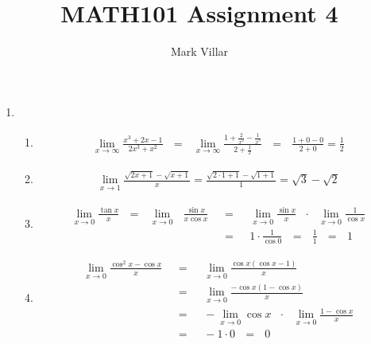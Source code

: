 \documentclass[12pt]{amsart}
\title{MATH101 Assignment 4}
\author{Mark Villar}
\begin{document}
 

\maketitle 

\begin{enumerate}
	
	\item 
	
		\begin{enumerate}
		
			\item 
				\begin{eqnarray}
				\lim_{x \rightarrow \infty} \frac{x^3+2x-1}{2x^3+x^2} \text{ }=\text{ }\lim_{x \rightarrow \infty}
				\frac{1+\frac{2}{x^2}-\frac{1}{x^3}}{2+\frac{1}{x}}\text{ }=\text{ }\frac{1+0-0}{2+0}=\frac{1}{2}
				\nonumber
				\end{eqnarray}
			
			\item  
				\begin{eqnarray}
				\lim_{x \rightarrow 1} \frac{\sqrt{2x+1}-\sqrt{x+1}}{x}=\frac{\sqrt{2\cdot1+1}-\sqrt{1+1}}{1}
				=\sqrt{3}-\sqrt{2} \nonumber
				\end{eqnarray}
			
			\item 
				\begin{eqnarray}
				\lim_{x \rightarrow 0} \frac{\tan{x}}{x}\text{ } = \text{ } \lim_{x \rightarrow 0} 
				\text{ }\frac{\sin{x}}{x\cos{x}}\text{ } & = & \text{ }\lim_{x \rightarrow 0} \frac{\sin{x}}{x}
				\text{ } \cdot \text{ } \lim_{x \rightarrow 0} \frac{1}{\cos{x}} \nonumber \\
				& = & \text{ }1\cdot\frac{1}{\cos{0}}\text{ } = \text{ } \frac{1}{1} \text{ } = \text{ } 1 \nonumber 
				\end{eqnarray}
								
			\item
				\begin{eqnarray}
				\lim_{x \rightarrow 0} \frac{\cos^2{x}-\cos{x}}{x} \text{ } & = & \text{ } \lim_{x \rightarrow 0} 
				\frac{\cos{x}(\cos{x}-1)}{x} \nonumber \\
				& = &  \text{ } \lim_{x \rightarrow 0} \frac{-\cos{x}(1-\cos{x})}{x} \nonumber \\
				& = & \text{ } -\lim_{x \rightarrow 0} \cos{x} \text{ } \cdot \text{ } \lim_{x \rightarrow 0}
				\frac{	1-\cos{x}}{x} \nonumber \\
				& = & \text{ } -1 \cdot 0 \text{ } = \text{ } 0 \nonumber
				\end{eqnarray}


\end{enumerate}
\end{enumerate}
\end{document}
